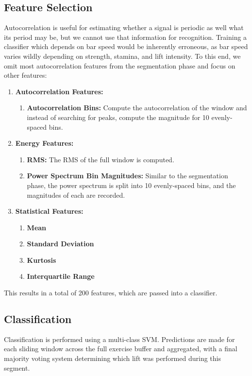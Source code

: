 \subsection{Feature Selection}
Autocorrelation is useful for estimating whether a signal is periodic as well what its period may be, but we cannot use that information for recognition. Training a classifier which depends on bar speed would be inherently erroneous, as bar speed varies wildly depending on strength, stamina, and lift intensity. To this end, we omit most autocorrelation features from the segmentation phase and focus on other features:

\begin{enumerate}
    \item \textbf{Autocorrelation Features:}
    \begin{enumerate}
        \item \textbf{Autocorrelation Bins:} Compute the autocorrelation of the window and instead of searching for peaks, compute the magnitude for 10 evenly-spaced bins.
    \end{enumerate}
    \item \textbf{Energy Features:}
    \begin{enumerate}
        \item \textbf{RMS:} The RMS of the full window is computed. 
        \item \textbf{Power Spectrum Bin Magnitudes:} Similar to the segmentation phase, the power spectrum is split into 10 evenly-spaced bins, and the magnitudes of each are recorded.
    \end{enumerate}
    \item \textbf{Statistical Features:}
    \begin{enumerate}
        \item \textbf{Mean}
        \item \textbf{Standard Deviation}
        \item \textbf{Kurtosis}
        \item \textbf{Interquartile Range}
    \end{enumerate}
\end{enumerate}

This results in a total of 200 features, which are passed into a classifier.

\subsection{Classification}
Classification is performed using a multi-class SVM. Predictions are made for each sliding window across the full exercise buffer and aggregated, with a final majority voting system determining which lift was performed during this segment.

